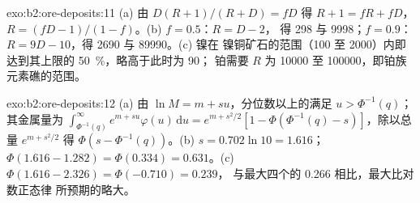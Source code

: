 \begin{solution}{exo:b2:ore-deposits:11}
(a) 由 $D(R + 1)/(R + D) = fD$ 得 $R + 1 = fR + fD$，$R = (fD - 1)/(1 - f)$。(b) $f = 0.5$：$R = D - 2$，
得 298 与 \num{9998}；$f = 0.9$：$R = 9D - 10$，得 \num{2690} 与 \num{89990}。(c) 镍在
镍铜矿石的范围（100 至 \num{2000}）内即达到其上限的 \qty{50}{\percent}，略高于此时为 90；
铂需要 $R$ 为 \num{10000} 至 \num{100000}，即铂族元素礁的范围。
\end{solution}

\begin{solution}{exo:b2:ore-deposits:12}
(a) 由 $\ln M = m + s u$，分位数以上的满足 $u > \Phi^{-1}(q)$；其金属量为
$\int_{\Phi^{-1}(q)}^{\infty} e^{m + su}\varphi(u)\,\mathrm{d}u = e^{m + s^2/2}[1 - \Phi(\Phi^{-1}(q) -
s)]$，除以总量 $e^{m + s^2/2}$ 得 $\Phi(s - \Phi^{-1}(q))$。(b) $s = 0.702 \ln 10 =
1.616$；$\Phi(1.616 - 1.282) = \Phi(0.334) = 0.631$。(c) $\Phi(1.616 - 2.326) = \Phi(-0.710) = 0.239$，
与最大四个的 0.266 相比，最大比对数正态律
所预期的略大。
\end{solution}

